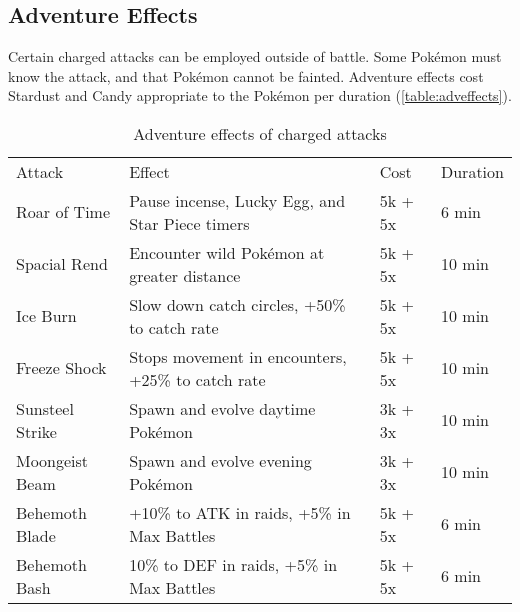 \subsection{Adventure Effects\label{sec:effects}}
Certain charged attacks can be employed outside of battle.
Some Pokémon must know the attack, and that Pokémon cannot be fainted.
Adventure effects cost Stardust and Candy appropriate to the Pokémon
  per duration (\autoref{table:adveffects}).
\begin{table}
  \centering
  \begin{tabular}{lp{}ll}
    Attack & Effect & Cost & Duration\\
    \Midrule
    Roar of Time & Pause incense, Lucky Egg, and Star Piece timers & 5k + 5x & 6 min\\
    Spacial Rend & Encounter wild Pokémon at greater distance & 5k + 5x & 10 min\\
    Ice Burn & Slow down catch circles, +50\% to catch rate & 5k + 5x & 10 min\\
    Freeze Shock & Stops movement in encounters, +25\% to catch rate & 5k + 5x & 10 min\\
    Sunsteel Strike & Spawn and evolve daytime Pokémon & 3k + 3x & 10 min\\
    Moongeist Beam & Spawn and evolve evening Pokémon & 3k + 3x & 10 min\\
    Behemoth Blade & +10\% to ATK in raids, +5\% in Max Battles & 5k + 5x & 6 min\\
    Behemoth Bash & 10\% to DEF in raids, +5\% in Max Battles & 5k + 5x & 6 min\\
  \end{tabular}
  \caption{Adventure effects of charged attacks\label{table:adveffects}}
\end{table}

